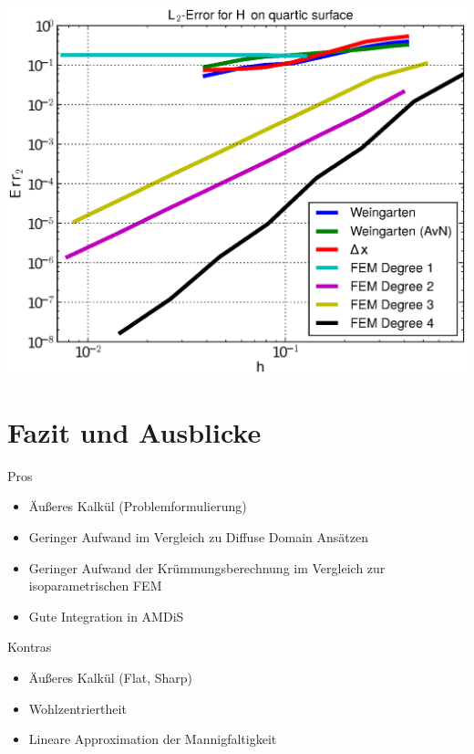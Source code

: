\documentclass{beamer}
\begin{document}
\begin{frame}
\begin{overprint}
\begin{minipage}[t]{0.49\textwidth}
            \centering\includegraphics[width=\textwidth]{bilder/Curvature/heineB/ErrHL2_7.eps}
          \end{minipage}
    \end{overprint}
  \end{frame}

\section{Fazit und Ausblicke}

  \begin{frame}
    \begin{block}{Pros}
      \begin{itemize}
        \item Äußeres Kalkül (Problemformulierung)
        \item Geringer Aufwand im Vergleich zu Diffuse Domain Ansätzen 
        \item Geringer Aufwand der Krümmungsberechnung im Vergleich zur isoparametrischen FEM
        \item Gute Integration in AMDiS
      \end{itemize}
    \end{block}
    \pause
    \begin{block}{Kontras}
      \begin{itemize}
        \item Äußeres Kalkül (Flat, Sharp)
        \item Wohlzentriertheit
        \item Lineare Approximation der Mannigfaltigkeit
      \end{itemize}
    \end{block}
  \end{frame}
\end{document}
